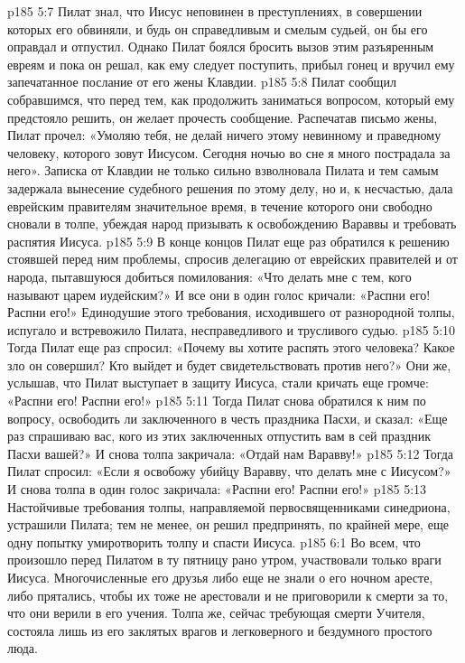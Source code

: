 \vs p185 5:7 Пилат знал, что Иисус неповинен в преступлениях, в совершении которых его обвиняли, и будь он справедливым и смелым судьей, он бы его оправдал и отпустил. Однако Пилат боялся бросить вызов этим разъяренным евреям и пока он решал, как ему следует поступить, прибыл гонец и вручил ему запечатанное послание от его жены Клавдии.
\vs p185 5:8 Пилат сообщил собравшимся, что перед тем, как продолжить заниматься вопросом, который ему предстояло решить, он желает прочесть сообщение. Распечатав письмо жены, Пилат прочел: «Умоляю тебя, не делай ничего этому невинному и праведному человеку, которого зовут Иисусом. Сегодня ночью во сне я много пострадала за него». Записка от Клавдии не только сильно взволновала Пилата и тем самым задержала вынесение судебного решения по этому делу, но и, к несчастью, дала еврейским правителям значительное время, в течение которого они свободно сновали в толпе, убеждая народ призывать к освобождению Вараввы и требовать распятия Иисуса.
\vs p185 5:9 В конце концов Пилат еще раз обратился к решению стоявшей перед ним проблемы, спросив делегацию от еврейских правителей и от народа, пытавшуюся добиться помилования: «Что делать мне с тем, кого называют царем иудейским?» И все они в один голос кричали: «Распни его! Распни его!» Единодушие этого требования, исходившего от разнородной толпы, испугало и встревожило Пилата, несправедливого и трусливого судью.
\vs p185 5:10 Тогда Пилат еще раз спросил: «Почему вы хотите распять этого человека? Какое зло он совершил? Кто выйдет и будет свидетельствовать против него?» Они же, услышав, что Пилат выступает в защиту Иисуса, стали кричать еще громче: «Распни его! Распни его!»
\vs p185 5:11 Тогда Пилат снова обратился к ним по вопросу, освободить ли заключенного в честь праздника Пасхи, и сказал: «Еще раз спрашиваю вас, кого из этих заключенных отпустить вам в сей праздник Пасхи вашей?» И снова толпа закричала: «Отдай нам Варавву!»
\vs p185 5:12 Тогда Пилат спросил: «Если я освобожу убийцу Варавву, что делать мне с Иисусом?» И снова толпа в один голос закричала: «Распни его! Распни его!»
\vs p185 5:13 Настойчивые требования толпы, направляемой первосвященниками синедриона, устрашили Пилата; тем не менее, он решил предпринять, по крайней мере, еще одну попытку умиротворить толпу и спасти Иисуса.
\vs p185 6:1 Во всем, что произошло перед Пилатом в ту пятницу рано утром, участвовали только враги Иисуса. Многочисленные его друзья либо еще не знали о его ночном аресте, либо прятались, чтобы их тоже не арестовали и не приговорили к смерти за то, что они верили в его учения. Толпа же, сейчас требующая смерти Учителя, состояла лишь из его заклятых врагов и легковерного и бездумного простого люда.
